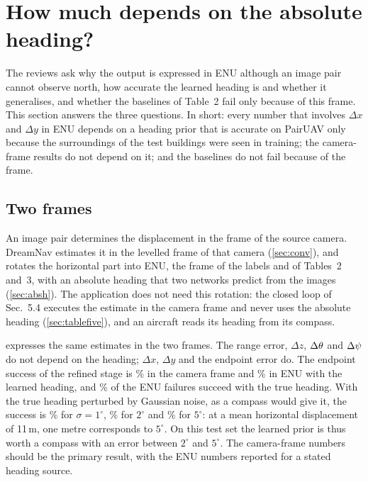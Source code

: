 \section{How much depends on the absolute heading?}
\label{sec:heading}

The reviews ask why the output is expressed in ENU although an image pair cannot observe north, how accurate the learned heading is and whether it generalises, and whether the baselines of Table~2 fail only because of this frame. This section answers the three questions. In short: every number that involves $\Delta x$ and $\Delta y$ in ENU depends on a heading prior that is accurate on PairUAV only because the surroundings of the test buildings were seen in training; the camera-frame results do not depend on it; and the baselines do not fail because of the frame.

\subsection{Two frames}
\label{sec:frames}

An image pair determines the displacement in the frame of the source camera. DreamNav estimates it in the levelled frame of that camera (\cref{sec:conv}), and rotates the horizontal part into ENU, the frame of the labels and of Tables~2 and~3, with an absolute heading that two networks predict from the images (\cref{sec:absh}). The application does not need this rotation: the closed loop of Sec.~5.4 executes the estimate in the camera frame and never uses the absolute heading (\cref{sec:tablefive}), and an aircraft reads its heading from its compass.




 expresses the same estimates in the two frames. The range error, $\Delta z$, $\Delta\theta$ and $\Delta\psi$ do not depend on the heading; $\Delta x$, $\Delta y$ and the endpoint error do. The endpoint success of the refined stage is \hdCamSRe\% in the camera frame and \hdEnuSRe\% in ENU with the learned heading, and \hdFailFixed\% of the ENU failures succeed with the true heading. With the true heading perturbed by Gaussian noise, as a compass would give it, the success is \hdCompOneSRe\% for $\sigma{=}1^\circ$, \hdCompTwoSRe\% for $2^\circ$ and \hdCompFiveSRe\% for $5^\circ$: at a mean horizontal displacement of 11\,m, one metre corresponds to $5^\circ$. On this test set the learned prior is thus worth a compass with an error between $2^\circ$ and $5^\circ$. The camera-frame numbers should be the primary result, with the ENU numbers reported for a stated heading source.

